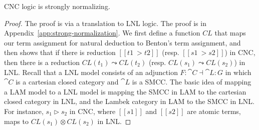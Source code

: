 \begin{theorem}
  \label{thm:strong-normalization}
  CNC logic is strongly normalizing.
\end{theorem}
\begin{proof}
  The proof is via a translation to LNL logic. The proof is in
  Appendix~\ref{app:strong-normalization}. We first define a function
  $CL$ that maps our term assignment for natural deduction to Benton's
  term assignment, and then shows that if there is reduction $[[t1 ~>  t2]]$ (resp. $[[s1 ~> s2]]$) in CNC, then there is a reduction
  $CL(t_1)\leadsto CL(t_2)$ (resp. $CL(s_1)\leadsto CL(s_2)$) in
  LNL. Recall that a LNL model consists of an adjunction
  $F:\cat{C}\dashv\cat{L}:G$ in which $\cat{C}$ is a cartesian closed
  category and $\cat{L}$ is a SMCC.  The basic idea of mapping a LAM
  model to a LNL model is mapping the SMCC in LAM to the cartesian
  closed category in LNL, and the Lambek category in LAM to the SMCC in
  LNL. For instance, $s_1\triangleright s_2$ in CNC, where $[[s1]]$ and
  $[[s2]]$ are atomic terms, maps to $CL(s_1)\otimes CL(s_2)$ in LNL.
\end{proof}

